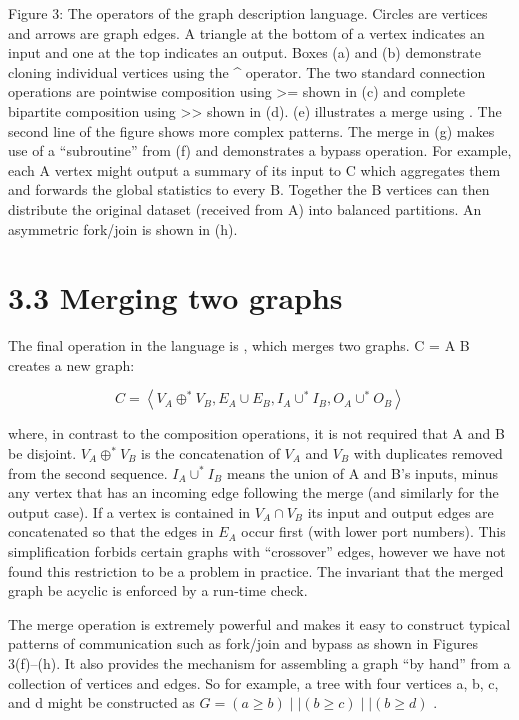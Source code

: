 \documentclass[
]{article}
\begin{document}
Figure 3: The operators of the graph description language. Circles are
vertices and arrows are graph edges. A triangle at the bottom of a
vertex indicates an input and one at the top indicates an output. Boxes
(a) and (b) demonstrate cloning individual vertices using the \^{}
operator. The two standard connection operations are pointwise
composition using \textgreater= shown in (c) and complete bipartite
composition using \textgreater\textgreater{} shown in (d). (e)
illustrates a merge using \textbar\textbar. The second line of the
figure shows more complex patterns. The merge in (g) makes use of a
``subroutine'' from (f) and demonstrates a bypass operation. For
example, each A vertex might output a summary of its input to C which
aggregates them and forwards the global statistics to every B. Together
the B vertices can then distribute the original dataset (received from
A) into balanced partitions. An asymmetric fork/join is shown in (h).

\section{3.3 Merging two graphs}\label{merging-two-graphs}

The final operation in the language is \textbar\textbar, which merges
two graphs. C = A \textbar\textbar{} B creates a new graph:

\[
C = \left\langle V _ {A} \oplus^ {*} V _ {B}, E _ {A} \cup E _ {B}, I _ {A} \cup^ {*} I _ {B}, O _ {A} \cup^ {*} O _ {B} \right\rangle
\]

where, in contrast to the composition operations, it is not required
that A and B be disjoint. \(V_{A} \oplus^{*} V_{B}\) is the
concatenation of \(V_{A}\) and \(V_{B}\) with duplicates removed from
the second sequence. \(I_{A} \cup^{*} I_{B}\) means the union of A and
B's inputs, minus any vertex that has an incoming edge following the
merge (and similarly for the output case). If a vertex is contained in
\(V_{A} \cap V_{B}\) its input and output edges are concatenated so that
the edges in \(E_{A}\) occur first (with lower port numbers). This
simplification forbids certain graphs with ``crossover'' edges, however
we have not found this restriction to be a problem in practice. The
invariant that the merged graph be acyclic is enforced by a run-time
check.

The merge operation is extremely powerful and makes it easy to construct
typical patterns of communication such as fork/join and bypass as shown
in Figures 3(f)--(h). It also provides the mechanism for assembling a
graph ``by hand'' from a collection of vertices and edges. So for
example, a tree with four vertices a, b, c, and d might be constructed
as \(G = (a \geq b) \mid \mid (b \geq c) \mid \mid (b \geq d)\) .
\end{document}
